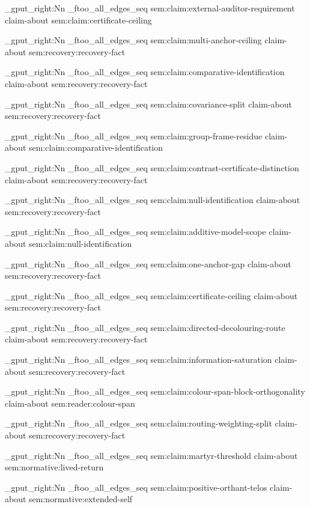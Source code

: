 \seq_gput_right:Nn \g_ftoo_all_edges_seq { { sem:claim:external-auditor-requirement } { claim-about } { sem:claim:certificate-ceiling } }

\seq_gput_right:Nn \g_ftoo_all_edges_seq { { sem:claim:multi-anchor-ceiling } { claim-about } { sem:recovery:recovery-fact } }

\seq_gput_right:Nn \g_ftoo_all_edges_seq { { sem:claim:comparative-identification } { claim-about } { sem:recovery:recovery-fact } }

\seq_gput_right:Nn \g_ftoo_all_edges_seq { { sem:claim:covariance-split } { claim-about } { sem:recovery:recovery-fact } }

\seq_gput_right:Nn \g_ftoo_all_edges_seq { { sem:claim:group-frame-residue } { claim-about } { sem:claim:comparative-identification } }

\seq_gput_right:Nn \g_ftoo_all_edges_seq { { sem:claim:contrast-certificate-distinction } { claim-about } { sem:recovery:recovery-fact } }

\seq_gput_right:Nn \g_ftoo_all_edges_seq { { sem:claim:null-identification } { claim-about } { sem:recovery:recovery-fact } }

\seq_gput_right:Nn \g_ftoo_all_edges_seq { { sem:claim:additive-model-scope } { claim-about } { sem:claim:null-identification } }

\seq_gput_right:Nn \g_ftoo_all_edges_seq { { sem:claim:one-anchor-gap } { claim-about } { sem:recovery:recovery-fact } }

\seq_gput_right:Nn \g_ftoo_all_edges_seq { { sem:claim:certificate-ceiling } { claim-about } { sem:recovery:recovery-fact } }

\seq_gput_right:Nn \g_ftoo_all_edges_seq { { sem:claim:directed-decolouring-route } { claim-about } { sem:recovery:recovery-fact } }

\seq_gput_right:Nn \g_ftoo_all_edges_seq { { sem:claim:information-saturation } { claim-about } { sem:recovery:recovery-fact } }

\seq_gput_right:Nn \g_ftoo_all_edges_seq { { sem:claim:colour-span-block-orthogonality } { claim-about } { sem:reader:colour-span } }

\seq_gput_right:Nn \g_ftoo_all_edges_seq { { sem:claim:routing-weighting-split } { claim-about } { sem:recovery:recovery-fact } }

\seq_gput_right:Nn \g_ftoo_all_edges_seq { { sem:claim:martyr-threshold } { claim-about } { sem:normative:lived-return } }

\seq_gput_right:Nn \g_ftoo_all_edges_seq { { sem:claim:positive-orthant-telos } { claim-about } { sem:normative:extended-self } }

